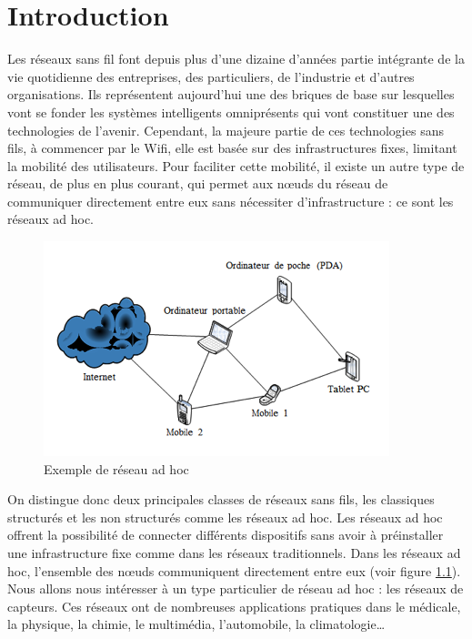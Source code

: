 
\chapter{Introduction}\label{intro}


Les réseaux sans fil font depuis plus d'une dizaine d'années partie intégrante de la vie quotidienne des entreprises, des particuliers, de l'industrie et d'autres organisations. Ils
représentent aujourd'hui une des briques de base sur lesquelles vont se fonder les systèmes
intelligents omniprésents qui vont constituer une des technologies de l'avenir. Cependant, la majeure partie de ces technologies sans fils, à commencer par le Wifi, elle est basée  sur des infrastructures fixes, limitant la mobilité des utilisateurs. Pour faciliter cette mobilité, il existe  un autre type de réseau, de plus en plus courant, qui  permet aux nœuds du réseau de communiquer directement entre eux sans nécessiter d’infrastructure : ce sont les réseaux ad hoc.

\begin{figure}[h]
\centering
\includegraphics[scale=0.5]{Intro/reseauAdHoc.png}
\caption{\label{reseauAdHoc} Exemple de réseau ad hoc}
\end{figure}

On distingue donc deux principales classes de réseaux sans fils, les classiques structurés et les non structurés comme les réseaux ad hoc. Les réseaux ad hoc offrent la possibilité de connecter différents dispositifs sans avoir à préinstaller une infrastructure fixe comme dans les réseaux traditionnels. Dans les réseaux ad hoc, l’ensemble des nœuds communiquent directement entre eux (voir figure \ref{reseauAdHoc}). Nous allons nous intéresser à un type particulier de réseau ad hoc :  les réseaux de capteurs. Ces réseaux ont de nombreuses applications pratiques dans le médicale, la physique, la chimie, le multimédia, l'automobile, la climatologie…



